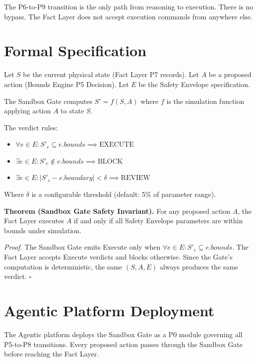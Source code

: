 \documentclass[12pt]{article}
\begin{document}
The P6-to-P9 transition is the only path from reasoning to execution. There is no bypass. The Fact Layer does not accept execution commands from anywhere else.

\section{Formal Specification}
\label{sec:formal}

Let $S$ be the current physical state (Fact Layer P7 records). Let $A$ be a proposed action (Bounds Engine P5 Decision). Let $E$ be the Safety Envelope specification.

The Sandbox Gate computes $S' = f(S, A)$ where $f$ is the simulation function applying action $A$ to state $S$.

The verdict rules:

\begin{itemize}
    \item $\forall e \in E: S'_e \subseteq e.bounds \implies \text{EXECUTE}$
    \item $\exists e \in E: S'_e \notin e.bounds \implies \text{BLOCK}$
    \item $\exists e \in E: |S'_e - e.boundary| < \delta \implies \text{REVIEW}$
\end{itemize}

Where $\delta$ is a configurable threshold (default: 5\% of parameter range).

\bigskip

\noindent\textbf{Theorem (Sandbox Gate Safety Invariant).}
For any proposed action $A$, the Fact Layer executes $A$ if and only if all Safety Envelope parameters are within bounds under simulation.

\textit{Proof.} The Sandbox Gate emits Execute only when $\forall e \in E: S'_e \subseteq e.bounds$. The Fact Layer accepts Execute verdicts and blocks otherwise. Since the Gate's computation is deterministic, the same $(S, A, E)$ always produces the same verdict. $\square$

\section{Agentic Platform Deployment}
\label{sec:deployment}

The Agentic platform deploys the Sandbox Gate as a P0 module governing all P5-to-P8 transitions. Every proposed action passes through the Sandbox Gate before reaching the Fact Layer.
\end{document}
